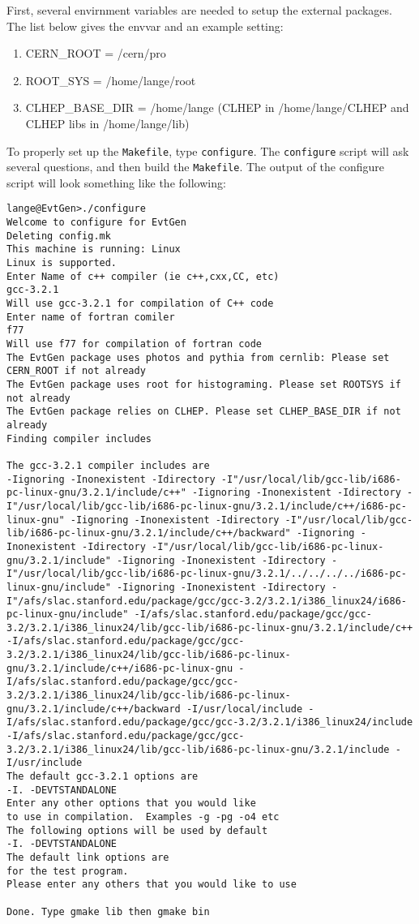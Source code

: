 First, several envirnment variables are needed to setup
the external packages.  The list below gives the envvar
and an example setting:
\begin{enumerate}
\item CERN\_ROOT = /cern/pro
\item ROOT\_SYS = /home/lange/root
\item  CLHEP\_BASE\_DIR = /home/lange
(CLHEP in /home/lange/CLHEP and CLHEP libs in /home/lange/lib)
\end{enumerate}

To properly set up the {\tt Makefile}, type {\tt configure}.
The {\tt configure} script will ask several questions,
and then build the {\tt Makefile}.  The output of the configure
script will look something like the following:
\begin{verbatim}
lange@EvtGen>./configure
Welcome to configure for EvtGen
Deleting config.mk
This machine is running: Linux
Linux is supported.
Enter Name of c++ compiler (ie c++,cxx,CC, etc)
gcc-3.2.1
Will use gcc-3.2.1 for compilation of C++ code
Enter name of fortran comiler
f77
Will use f77 for compilation of fortran code
The EvtGen package uses photos and pythia from cernlib: Please set CERN_ROOT if not already
The EvtGen package uses root for histograming. Please set ROOTSYS if not already
The EvtGen package relies on CLHEP. Please set CLHEP_BASE_DIR if not already
Finding compiler includes

The gcc-3.2.1 compiler includes are
-Iignoring -Inonexistent -Idirectory -I"/usr/local/lib/gcc-lib/i686-pc-linux-gnu/3.2.1/include/c++" -Iignoring -Inonexistent -Idirectory -I"/usr/local/lib/gcc-lib/i686-pc-linux-gnu/3.2.1/include/c++/i686-pc-linux-gnu" -Iignoring -Inonexistent -Idirectory -I"/usr/local/lib/gcc-lib/i686-pc-linux-gnu/3.2.1/include/c++/backward" -Iignoring -Inonexistent -Idirectory -I"/usr/local/lib/gcc-lib/i686-pc-linux-gnu/3.2.1/include" -Iignoring -Inonexistent -Idirectory -I"/usr/local/lib/gcc-lib/i686-pc-linux-gnu/3.2.1/../../../../i686-pc-linux-gnu/include" -Iignoring -Inonexistent -Idirectory -I"/afs/slac.stanford.edu/package/gcc/gcc-3.2/3.2.1/i386_linux24/i686-pc-linux-gnu/include" -I/afs/slac.stanford.edu/package/gcc/gcc-3.2/3.2.1/i386_linux24/lib/gcc-lib/i686-pc-linux-gnu/3.2.1/include/c++ -I/afs/slac.stanford.edu/package/gcc/gcc-3.2/3.2.1/i386_linux24/lib/gcc-lib/i686-pc-linux-gnu/3.2.1/include/c++/i686-pc-linux-gnu -I/afs/slac.stanford.edu/package/gcc/gcc-3.2/3.2.1/i386_linux24/lib/gcc-lib/i686-pc-linux-gnu/3.2.1/include/c++/backward -I/usr/local/include -I/afs/slac.stanford.edu/package/gcc/gcc-3.2/3.2.1/i386_linux24/include -I/afs/slac.stanford.edu/package/gcc/gcc-3.2/3.2.1/i386_linux24/lib/gcc-lib/i686-pc-linux-gnu/3.2.1/include -I/usr/include
The default gcc-3.2.1 options are 
-I. -DEVTSTANDALONE
Enter any other options that you would like
to use in compilation.  Examples -g -pg -o4 etc
The following options will be used by default
-I. -DEVTSTANDALONE
The default link options are  
for the test program.
Please enter any others that you would like to use

Done. Type gmake lib then gmake bin
\end{verbatim}

